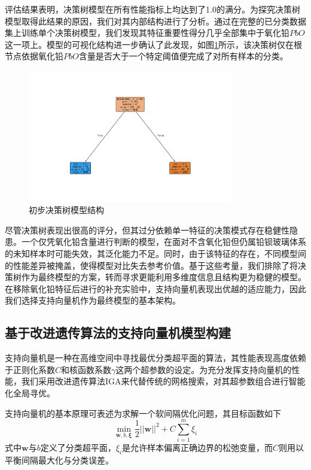评估结果表明，决策树模型在所有性能指标上均达到了1.0的满分。为探究决策树模型取得此结果的原因，我们对其内部结构进行了分析。通过在完整的已分类数据集上训练单个决策树模型，我们发现其特征重要性得分几乎全部集中于氧化铅$PbO$这一项上。模型的可视化结构进一步确认了此发现，如图\ref{fig:decision_tree_structure}所示，该决策树仅在根节点依据氧化铅$PbO$含量是否大于一个特定阈值便完成了对所有样本的分类。

\begin{figure}[H]
    \centering
    \includegraphics[width=0.8\textwidth]{figs/5问题三/初步决策树可视化图.png}
    \caption{初步决策树模型结构}
    \label{fig:decision_tree_structure}
\end{figure}

尽管决策树表现出很高的评分，但其过分依赖单一特征的决策模式存在稳健性隐患。一个仅凭氧化铅含量进行判断的模型，在面对不含氧化铅但仍属铅钡玻璃体系的未知样本时可能失效，其泛化能力不足。同时，由于该特征的存在，不同模型间的性能差异被掩盖，使得模型对比失去参考价值。基于这些考量，我们排除了将决策树作为最终模型的方案，转而寻求更能利用多维度信息且结构更为稳健的模型。在移除氧化铅特征后进行的补充实验中，支持向量机表现出优越的适应能力，因此我们选择支持向量机作为最终模型的基本架构。

\subsection{基于改进遗传算法的支持向量机模型构建}

支持向量机是一种在高维空间中寻找最优分类超平面的算法，其性能表现高度依赖于正则化系数$C$和核函数系数$\gamma$这两个超参数的设定。为充分发挥支持向量机的性能，我们采用改进遗传算法IGA来代替传统的网格搜索，对其超参数组合进行智能化全局寻优。

支持向量机的基本原理可表述为求解一个软间隔优化问题，其目标函数如下
\begin{equation}
    \min_{\boldsymbol{w}, b, \boldsymbol{\xi}} \frac{1}{2} ||\boldsymbol{w}||^2 + C \sum_{i=1}^{m} \xi_i
\end{equation}
式中$\boldsymbol{w}$与$b$定义了分类超平面，$\xi_i$是允许样本偏离正确边界的松弛变量，而$C$则用以平衡间隔最大化与分类误差。

